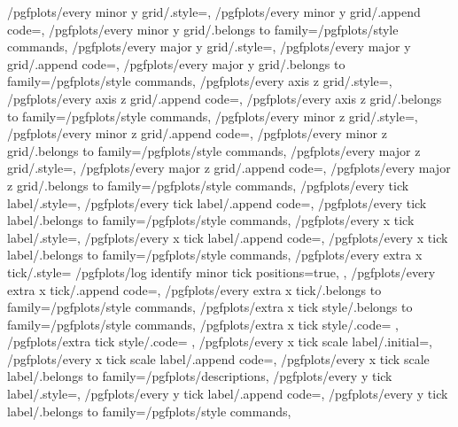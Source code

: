 {	/pgfplots/every minor y grid/.style={},
	/pgfplots/every minor y grid/.append code={},
	/pgfplots/every minor y grid/.belongs to family=/pgfplots/style commands,
	/pgfplots/every major y grid/.style={},
	/pgfplots/every major y grid/.append code={},
	/pgfplots/every major y grid/.belongs to family=/pgfplots/style commands,
	/pgfplots/every axis z grid/.style={},
	/pgfplots/every axis z grid/.append code={},
	/pgfplots/every axis z grid/.belongs to family=/pgfplots/style commands,
	/pgfplots/every minor z grid/.style={},
	/pgfplots/every minor z grid/.append code={},
	/pgfplots/every minor z grid/.belongs to family=/pgfplots/style commands,
	/pgfplots/every major z grid/.style={},
	/pgfplots/every major z grid/.append code={},
	/pgfplots/every major z grid/.belongs to family=/pgfplots/style commands,
	/pgfplots/every tick label/.style={},
	/pgfplots/every tick label/.append code={},
	/pgfplots/every tick label/.belongs to family=/pgfplots/style commands,
	/pgfplots/every x tick label/.style={},
	/pgfplots/every x tick label/.append code={},
	/pgfplots/every x tick label/.belongs to family=/pgfplots/style commands,
	/pgfplots/every extra x tick/.style={
		/pgfplots/log identify minor tick positions=true,
	},
	/pgfplots/every extra x tick/.append code={},
	/pgfplots/every extra x tick/.belongs to family=/pgfplots/style commands,
	/pgfplots/extra x tick style/.belongs to family=/pgfplots/style commands,
	/pgfplots/extra x tick style/.code={%
	},
	/pgfplots/extra tick style/.code={%
	},
	/pgfplots/every x tick scale label/.initial=,%
	/pgfplots/every x tick scale label/.append code={},
	/pgfplots/every x tick scale label/.belongs to family=/pgfplots/descriptions,
	/pgfplots/every y tick label/.style={},
	/pgfplots/every y tick label/.append code={},
	/pgfplots/every y tick label/.belongs to family=/pgfplots/style commands,
}
